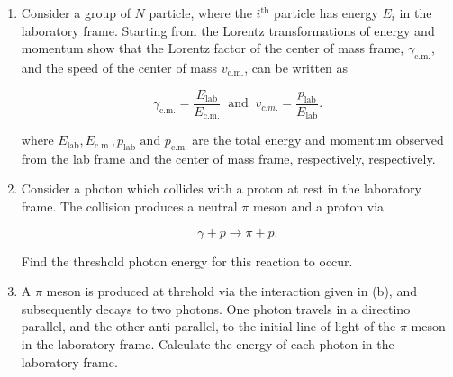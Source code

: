 \documentclass[english,a4paper,12pt]{report}
\begin{document}
{\begin{enumerate}
    \item Consider a group of \(N\) particle, where the \(i^{\text{th}} \) particle has energy \(E_{i} \) in the laboratory frame. Starting from the Lorentz transformations of energy and momentum show that the Lorentz factor of the center of mass frame, \(\gamma _{\text{c.m.} } \), and the speed of the center of mass \(v_{\text{c.m.} } \), can be written as 
    
    \begin{equation}
        \gamma _{\text{c.m.} } = \frac{E_{\text{lab} }  }{E_{\text{c.m.} } } ~\text { and }~  v _{c.m.} = \frac{p_{\text{lab} } }{E_{\text{lab} } }.  
    \end{equation}

    where \(E_{\text{lab} }, E_{\text{c.m.} }, p_{\text{lab} } \text { and }   p_{\text{c.m.} }   \) are the total energy and momentum observed from the lab frame and the center of mass frame, respectively, respectively.

    
    \item Consider a photon which collides with a proton at rest in the laboratory frame. The collision produces a neutral \(\pi \)  meson and a proton via 
    
    \begin{equation}
        \gamma + p \to \pi + p.
    \end{equation}
    
    Find the threshold photon energy for this reaction to occur.

    \item A \(\pi \) meson is produced at threhold via the interaction given in (b), and subsequently decays to two photons. One photon travels in a directino parallel, and the other anti-parallel, to the initial line of light of the \(\pi \) meson in the laboratory frame. Calculate the energy of each photon in the laboratory frame.     
\end{enumerate}
~
}
\end{document}
